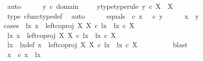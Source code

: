 \begin{isabellebody}
\ auto\isanewline
\ \ \ \ \isamarkupfalse%
\ {\isachardoublequoteopen}y\ {\isasymin}\isactrlsub c\ domain\ {\isasymrho}{\isachardoublequoteclose}\ \isamarkupfalse%
\ \isamarkupfalse%
\ y{\isacharunderscore}{\kern0pt}type{\isacharbrackleft}{\kern0pt}type{\isacharunderscore}{\kern0pt}rule{\isacharbrackright}{\kern0pt}{\isacharcolon}{\kern0pt}\ {\isachardoublequoteopen}y\ {\isasymin}\isactrlsub c\ X\ {\isasymCoprod}\ X{\isachardoublequoteclose}\isanewline
\ \ \ \ \ \ \isamarkupfalse%
\ {\isasymrho}{\isacharunderscore}{\kern0pt}type\ cfunc{\isacharunderscore}{\kern0pt}type{\isacharunderscore}{\kern0pt}def\ \isamarkupfalse%
\ auto\isanewline
\ \ \ \ \isamarkupfalse%
\ equals{\isacharcolon}{\kern0pt}\ {\isachardoublequoteopen}{\isasymrho}\ {\isasymcirc}\isactrlsub c\ x\ {\isacharequal}{\kern0pt}\ {\isasymrho}\ {\isasymcirc}\isactrlsub c\ y{\isachardoublequoteclose}\isanewline
\ \ \ \ \isamarkupfalse%
\ {\isachardoublequoteopen}x\ {\isacharequal}{\kern0pt}\ y{\isachardoublequoteclose}\isanewline
\ \ \ \ \isamarkupfalse%
{\isacharparenleft}{\kern0pt}cases\ {\isachardoublequoteopen}{\isasymexists}\ lx{\isachardot}{\kern0pt}\ x\ {\isacharequal}{\kern0pt}\ left{\isacharunderscore}{\kern0pt}coproj\ X\ X\ {\isasymcirc}\isactrlsub c\ lx\ {\isasymand}\ lx\ {\isasymin}\isactrlsub c\ X{\isachardoublequoteclose}{\isacharparenright}{\kern0pt}\isanewline
\ \ \ \ \ \ \isamarkupfalse%
\ {\isachardoublequoteopen}{\isasymexists}lx{\isachardot}{\kern0pt}\ x\ {\isacharequal}{\kern0pt}\ left{\isacharunderscore}{\kern0pt}coproj\ X\ X\ {\isasymcirc}\isactrlsub c\ lx\ {\isasymand}\ lx\ {\isasymin}\isactrlsub c\ X{\isachardoublequoteclose}\isanewline
\ \ \ \ \ \ \isamarkupfalse%
\ \isamarkupfalse%
\ lx\ \ lx{\isacharunderscore}{\kern0pt}def{\isacharcolon}{\kern0pt}\ {\isachardoublequoteopen}x\ {\isacharequal}{\kern0pt}\ left{\isacharunderscore}{\kern0pt}coproj\ X\ X\ {\isasymcirc}\isactrlsub c\ lx\ {\isasymand}\ lx\ {\isasymin}\isactrlsub c\ X{\isachardoublequoteclose}\isanewline
\ \ \ \ \ \ \ \ \isamarkupfalse%
\ blast\isanewline
\ \ \ \ \ \ \isamarkupfalse%
\ {\isasymrho}x{\isacharcolon}{\kern0pt}\ {\isachardoublequoteopen}{\isasymrho}\ {\isasymcirc}\isactrlsub c\ x\ {\isacharequal}{\kern0pt}\ {\isasymlangle}lx{\isacharcomma}{\kern0pt}\ {\isasymt}{\isasymrangle}{\isachardoublequoteclose}\isanewline
\ \ \ \ \ \ \isamarkupfalse%

\end{isabellebody}

